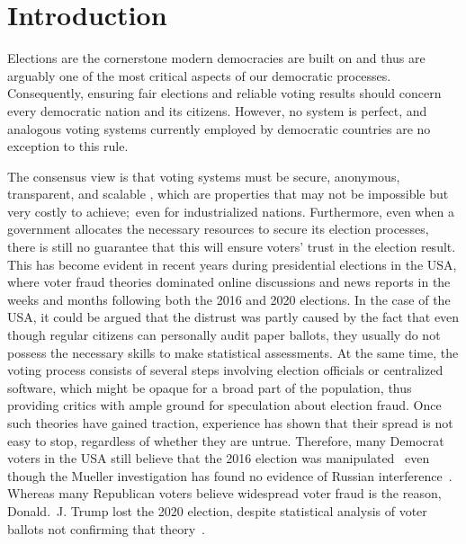\chapter{Introduction}\label{ch:intro}

Elections are the cornerstone modern democracies are built on and thus are arguably one of the most critical aspects of our democratic processes.
Consequently, ensuring fair elections and reliable voting results should concern every democratic nation and its citizens.
However, no system is perfect, and analogous voting systems currently employed by democratic countries are no exception to this rule.

The consensus view is that voting systems must be secure, anonymous, transparent, and scalable
\autocites[9-11]{jafar_blockchain_2021}[3]{diaz-santiso_e-voting_2021}{lowry_desirable_2009}[10-12]{tas_systematic_2020},
which are properties that may not be impossible but very costly to achieve;\ even for industrialized nations.
Furthermore, even when a government allocates the necessary resources to secure its election processes, there is still no
guarantee that this will ensure voters’ trust in the election result.
This has become evident in recent years during presidential elections in the \Gls{USA}, where voter fraud theories dominated online discussions and news reports in the weeks and months following both the 2016 and 2020 elections.
In the case of the \Gls{USA}, it could be argued that the distrust was partly caused by the fact that even though regular citizens can personally audit paper ballots, they usually do not possess the necessary skills to make statistical assessments.
At the same time, the voting process consists of several steps involving election officials or centralized software, which might be opaque for a broad part of the population, thus providing critics with ample ground for speculation about election fraud.
Once such theories have gained traction, experience has shown that their spread is not easy to stop, regardless of whether they are untrue.
Therefore, many Democrat voters in the \Gls{USA} still believe that the 2016 election was manipulated~\autocite{sinclair_its_2018} even though the Mueller investigation has found no evidence of Russian interference~\autocite{mueller_report_2019}.
Whereas many Republican voters believe widespread voter fraud is the reason, Donald.\ J. Trump lost the 2020 election, despite statistical analysis of voter ballots not confirming that theory~\autocite{eggers_no_2021}.

